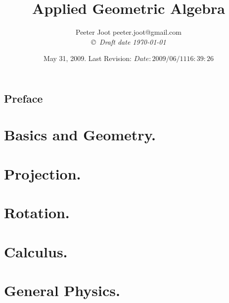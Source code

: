 \documentclass[12pt,leqno]{book}
\title{Applied Geometric Algebra}
\author{Peeter Joot  \quad peeter.joot@gmail.com \\
{\small\em \copyright \  Draft date \today }}
\date{ May 31, 2009.  Last Revision: $Date: 2009/06/11 16:39:26 $ }
\begin{document}
\maketitle
\tableofcontents
\listoffigures
\listoftables
\chapter*{Preface}\normalsize
\pagestyle{plain}


\pagestyle{headings}


\part{Basics and Geometry.}


















\part{Projection.}






\part{Rotation.}





\part{Calculus.}






\part{General Physics.}









\end{document}
